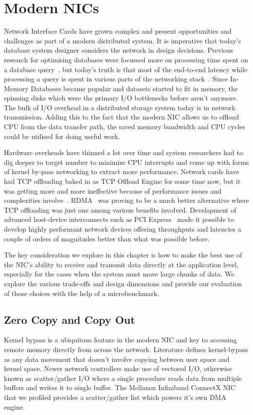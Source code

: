 \chapter{Modern NICs}
\label{chap:modernnics}
Network Interface Cards have grown complex and present opportunities and challenges as part of a modern distributed system.
 It is imperative that today’s database system designer considers the network in design decisions.
 Previous research for optimising databases were focussed more on processing time spent on a database query~\cite{dbmsproctime},
  but today’s truth is that most of the end-to-end latency while processing a query is spent in various parts of the networking stack~\cite{ramcloudosr}.
Since In-Memory Databases became popular and datasets started to fit in memory, the spinning disks 
which were the primary I/O bottlenecks before aren't anymore. The bulk of I/O overhead in a distributed storage system today is in network transmission.
Adding this to the fact that the modern NIC allows us to offload CPU from the data transfer path,
the saved memory bandwidth and CPU cycles could be utilised for doing useful work.

Hardware overheads have thinned a lot over time and system researchers had to dig deeper to target number to minimize CPU interrupts and come up with forms of kernel by-pass networking to extract more performance.
 Network cards have had TCP offloading baked in as TCP Offload Engine for some time now, but it was getting more and more ineffective because of performance issues and complexities involve~\cite{tcpoffload}. 
 RDMA~\cite{rdmapatent,rdmacase,rdma} was proving to be a much better alternative where TCP offloading was just one among various benefits involved.
  Development of advanced host-device interconnects such as PCI Express~\cite{pcie}  made it possible to develop highly performant network devices offering throughputs and latencies a couple of orders of magnitudes better than what was possible before.

 The key consideration we explore in this chapter is how to make the best use of the NIC’s ability to receive and transmit data directly at the application level, especially for the
cases when the system must move large chunks of data. We explore the various trade-offs and design dimensions and provide our evaluation of those choices with the help of a microbenchmark.

\section{Zero Copy and Copy Out}
Kernel bypass is a ubiquitous feature in the modern NIC and key to accessing remote memory directly 
from across the network. Literature defines kernel-bypass as any data movement that doesn't 
involve copying between user space and kernel space. Newer network controllers make use of vectored I/O, otherwise known as scatter/gather I/O
where a single procedure reads data from multiple buffers and writes it to single buffer. The Mellanox Infiniband ConnectX
NIC that we profiled provides a scatter/gather list which powers it's own DMA engine.

